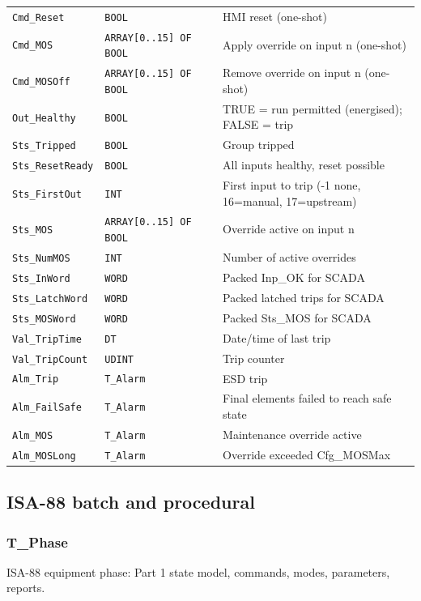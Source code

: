 {\begin{longtable}{@{}>{\raggedright\arraybackslash}p{3.4cm}>{\raggedright\arraybackslash}p{3.3cm}>{\raggedright\arraybackslash}p{1.3cm}>{\raggedright\arraybackslash}p{6.4cm}@{}}
\texttt{Cmd\_Reset} & \texttt{BOOL} &  & HMI reset (one-shot) \\
\texttt{Cmd\_MOS} & \texttt{ARRAY[0..15] OF BOOL} &  & Apply override on input n (one-shot) \\
\texttt{Cmd\_MOSOff} & \texttt{ARRAY[0..15] OF BOOL} &  & Remove override on input n (one-shot) \\
\texttt{Out\_Healthy} & \texttt{BOOL} &  & TRUE = run permitted (energised); FALSE = trip \\
\texttt{Sts\_Tripped} & \texttt{BOOL} &  & Group tripped \\
\texttt{Sts\_ResetReady} & \texttt{BOOL} &  & All inputs healthy, reset possible \\
\texttt{Sts\_FirstOut} & \texttt{INT} &  & First input to trip (-1 none, 16=manual, 17=upstream) \\
\texttt{Sts\_MOS} & \texttt{ARRAY[0..15] OF BOOL} &  & Override active on input n \\
\texttt{Sts\_NumMOS} & \texttt{INT} &  & Number of active overrides \\
\texttt{Sts\_InWord} & \texttt{WORD} &  & Packed Inp\_OK for SCADA \\
\texttt{Sts\_LatchWord} & \texttt{WORD} &  & Packed latched trips for SCADA \\
\texttt{Sts\_MOSWord} & \texttt{WORD} &  & Packed Sts\_MOS for SCADA \\
\texttt{Val\_TripTime} & \texttt{DT} &  & Date/\allowbreak{}time of last trip \\
\texttt{Val\_TripCount} & \texttt{UDINT} &  & Trip counter \\
\texttt{Alm\_Trip} & \texttt{T\_Alarm} &  & ESD trip \\
\texttt{Alm\_FailSafe} & \texttt{T\_Alarm} &  & Final elements failed to reach safe state \\
\texttt{Alm\_MOS} & \texttt{T\_Alarm} &  & Maintenance override active \\
\texttt{Alm\_MOSLong} & \texttt{T\_Alarm} &  & Override exceeded Cfg\_MOSMax \\
\bottomrule
\end{longtable}
}
\subsection{ISA-88 batch and procedural}
\subsubsection*{T\_Phase}
\label{app:pclib:tphase}
ISA-88 equipment phase: Part 1 state model, commands, modes, parameters, reports.

